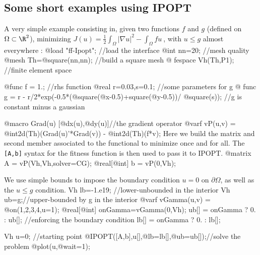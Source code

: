 \documentclass[a4paper,twoside,12pt]{book}
\begin{document}
\subsection{Some short examples using IPOPT}
\begin{example}
A very simple example consisting in, given two functions $f $ and $g$ (defined on $\Omega\subset\R^{2}$),  minimizing $J(u) = \displaystyle{\frac{1}{2}\int_{\Omega} \vert\nabla u\vert^{2}  - \int_{\Omega}fu}\ $, with $u\leq g$ almost everywhere :
\bFF
  @load "ff-Ipopt"; //load the interface
  @int nn=20; //mesh quality
  @mesh Th=@square(nn,nn); //build a square mesh
 @ fespace Vh(Th,P1); //finite element space

  @func f = 1.; //rhs function
  @real r=0.03,s=0.1; //some parameters for g
 @ func g = r - r/2*exp(-0.5*(@square(@x-0.5)+square(@y-0.5))/ @square(s));
//g is constant minus a gaussian

  @macro Grad(u) [@dx(u),@dy(u)]//the gradient operator
  @varf vP(u,v) = @int2d(Th)(Grad(u)'*Grad(v)) - @int2d(Th)(f*v);
\eFF
Here we build the matrix and second member associated to the functional to minimize once and for all. The {\tt [A,b]} syntax for the fitness function is then used to pass it to IPOPT.
\bFF
  @matrix A = vP(Vh,Vh,solver=CG);
  @real[@int] b = vP(0,Vh);
\eFF

We use simple bounds to impose the boundary condition $u=0$ on $\partial\Omega$, as well as the $u\leq g$ condition.
\bFF
  Vh lb=-1.e19; //lower-unbounded in the interior
  Vh ub=g;//upper-bounded by g in the interior
  @varf vGamma(u,v) = @on(1,2,3,4,u=1); 
  @real[@int] onGamma=vGamma(0,Vh);
  ub[] = onGamma ? 0. : ub[]; //enforcing the boundary condition
  lb[] = onGamma ? 0. : lb[]; 

  Vh u=0; //starting point
  @IPOPT([A,b],u[],@lb=lb[],@ub=ub[]);//solve the problem
  @plot(u,@wait=1);
\eFF
\end{example}
\end{document}
